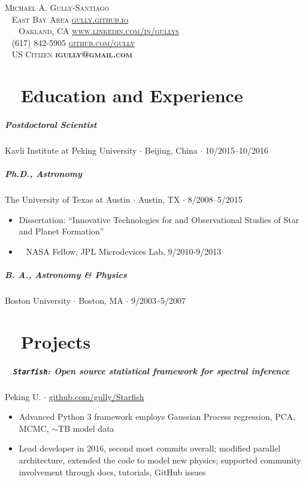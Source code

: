 \documentclass[10pt,letterpaper]{article}
\newcommand{\namestyle}{\Huge \scshape}
\newcommand{\addressstyle}{\color{addresscolor}  \footnotesize \sffamily \upshape}
\begin{document}
\begin{flushleft}
    \namestyle Michael A. Gully-Santiago \\[0.3em]
    \addressstyle 
    \faMapMarker ~ East Bay Area  \hfill \url{gully.github.io} ~ \faExternalLink \\
    ~ ~ Oakland, CA  \hfill  \url{www.linkedin.com/in/gullys} ~ \faLinkedin \\
    \faPhone ~ (617) 842-5905 \hfill \url{github.com/gully} ~ \faGithub \\
    \faGlobe ~ US Citizen \hfill \textbf{igully@gmail.com} ~ \faInbox\\

\end{flushleft}

\small

\section*{\faInstitution ~ Education and Experience}

\subparagraph{Postdoctoral Scientist}
Kavli Institute at Peking University $\cdot$ Beijing, China $\cdot$ 10/2015--10/2016

\subparagraph{\textbf{Ph.D}., Astronomy}
The University of Texas at Austin $\cdot$ Austin, TX $\cdot$ 8/2008--5/2015
\begin{itemize}
    \item Dissertation: ``Innovative Technologies for and Observational Studies of Star and Planet Formation''
    \item \faRocket ~ NASA Fellow, JPL Microdevices Lab, 9/2010-9/2013
\end{itemize}

\subparagraph{\textbf{B. A.}, Astronomy \& Physics}
Boston University $\cdot$ Boston, MA $\cdot$ 9/2003--5/2007

\section*{\faLineChart ~ Projects}

\subparagraph{\faCodeFork ~ \texttt{Starfish}: Open source statistical framework for spectral inference}
Peking U. $\cdot$ \href{https://github.com/gully/Starfish}{github.com/gully/Starfish}
\begin{itemize}
    \item Advanced Python 3 framework employs Gaussian Process regression, PCA, MCMC, $\sim$TB model data
    \item Lead developer in 2016, second most commits overall; modified parallel architecture, extended the code to model new physics; supported community involvement through docs, tutorials, GitHub issues
\end{itemize}
\end{document}

